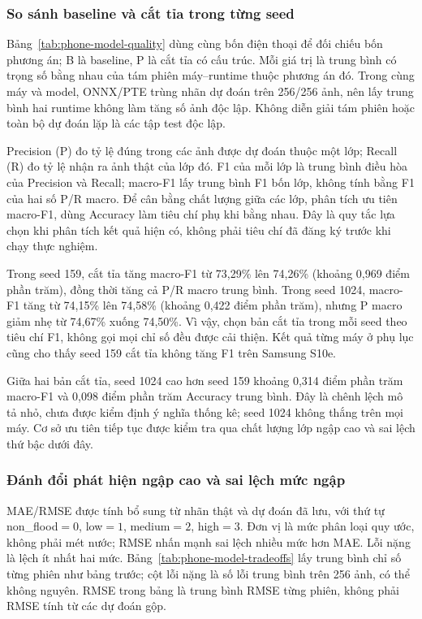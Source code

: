 \subsubsection{So sánh baseline và cắt tỉa trong từng seed}
Bảng~\ref{tab:phone-model-quality} dùng cùng bốn điện thoại để đối chiếu bốn phương án; B là baseline, P là cắt tỉa có cấu trúc. Mỗi giá trị là trung bình có trọng số bằng nhau của tám phiên máy--runtime thuộc phương án đó. Trong cùng máy và model, ONNX/PTE trùng nhãn dự đoán trên 256/256 ảnh, nên lấy trung bình hai runtime không làm tăng số ảnh độc lập. Không diễn giải tám phiên hoặc toàn bộ dự đoán lặp là các tập test độc lập.



Precision (P) đo tỷ lệ đúng trong các ảnh được dự đoán thuộc một lớp; Recall (R) đo tỷ lệ nhận ra ảnh thật của lớp đó. F1 của mỗi lớp là trung bình điều hòa của Precision và Recall; macro-F1 lấy trung bình F1 bốn lớp, không tính bằng F1 của hai số P/R macro. Để cân bằng chất lượng giữa các lớp, phân tích ưu tiên macro-F1, dùng Accuracy làm tiêu chí phụ khi bằng nhau. Đây là quy tắc lựa chọn khi phân tích kết quả hiện có, không phải tiêu chí đã đăng ký trước khi chạy thực nghiệm.

Trong seed 159, cắt tỉa tăng macro-F1 từ 73,29\% lên 74,26\% (khoảng 0,969 điểm phần trăm), đồng thời tăng cả P/R macro trung bình. Trong seed 1024, macro-F1 tăng từ 74,15\% lên 74,58\% (khoảng 0,422 điểm phần trăm), nhưng P macro giảm nhẹ từ 74,67\% xuống 74,50\%. Vì vậy, chọn bản cắt tỉa trong mỗi seed theo tiêu chí F1, không gọi mọi chỉ số đều được cải thiện. Kết quả từng máy ở phụ lục cũng cho thấy seed 159 cắt tỉa không tăng F1 trên Samsung S10e.

Giữa hai bản cắt tỉa, seed 1024 cao hơn seed 159 khoảng 0,314 điểm phần trăm macro-F1 và 0,098 điểm phần trăm Accuracy trung bình. Đây là chênh lệch mô tả nhỏ, chưa được kiểm định ý nghĩa thống kê; seed 1024 không thắng trên mọi máy. Cơ sở ưu tiên tiếp tục được kiểm tra qua chất lượng lớp ngập cao và sai lệch thứ bậc dưới đây.

\subsubsection{Đánh đổi phát hiện ngập cao và sai lệch mức ngập}
MAE/RMSE được tính bổ sung từ nhãn thật và dự đoán đã lưu, với thứ tự non\_flood$=0$, low$=1$, medium$=2$, high$=3$. Đơn vị là mức phân loại quy ước, không phải mét nước; RMSE nhấn mạnh sai lệch nhiều mức hơn MAE. Lỗi nặng là lệch ít nhất hai mức. Bảng~\ref{tab:phone-model-tradeoffs} lấy trung bình chỉ số từng phiên như bảng trước; cột lỗi nặng là số lỗi trung bình trên 256 ảnh, có thể không nguyên. RMSE trong bảng là trung bình RMSE từng phiên, không phải RMSE tính từ các dự đoán gộp.

